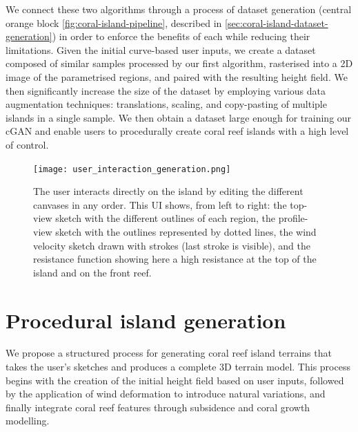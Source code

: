 We connect these two algorithms through a process of dataset generation (central orange block \cref{fig:coral-island-pipeline}, described in \cref{sec:coral-island-dataset-generation}) in order to enforce the benefits of each while reducing their limitations. Given the initial curve-based user inputs, we create a dataset composed of similar samples processed by our first algorithm, rasterised into a 2D image of the parametrised regions, and paired with the resulting height field. We then significantly increase the size of the dataset by employing various data augmentation techniques: translations, scaling, and copy-pasting of multiple islands in a single sample. We then obtain a dataset large enough for training our cGAN and enable users to procedurally create coral reef islands with a high level of control.

\begin{figure}
    \centering
    \texttt{[image: user\_interaction\_generation.png]}
    \caption{The user interacts directly on the island by editing the different canvases in any order. This UI shows, from left to right: the top-view sketch with the different outlines of each region, the profile-view sketch with the outlines represented by dotted lines, the wind velocity sketch drawn with strokes (last stroke is visible), and the resistance function showing here a high resistance at the top of the island and on the front reef.}
    \label{fig:coral-island-wind-from-strokes-interaction}
\end{figure}


























\section{Procedural island generation}
\label{sec:coral-island-example-generation}

We propose a structured process for generating coral reef island terrains that takes the user's sketches and produces a complete 3D terrain model. This process begins with the creation of the initial height field based on user inputs, followed by the application of wind deformation to introduce natural variations, and finally integrate coral reef features through subsidence and coral growth modelling.

